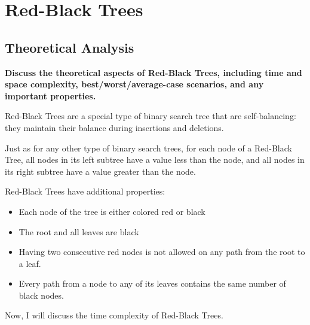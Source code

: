 \documentclass[12pt]{amsart}
\begin{document}
\section{Red-Black Trees}

\subsection{Theoretical Analysis}

    \textbf{Discuss the theoretical aspects of Red-Black Trees,
    including time and space complexity, best/worst/average-case
    scenarios, and any important properties.}
	
	Red-Black Trees are a special type of binary search tree
    that are self-balancing: they maintain their balance during
    insertions and deletions.
    
    Just as for any other type of binary search trees, for each
    node of a Red-Black Tree, all nodes in its left subtree have
    a value less than the node, and all nodes in its right
    subtree have a value greater than the node.
    
    Red-Black Trees have additional properties:
    
    \begin{itemize}
    	\item Each node of the tree is either colored red or
            black
    	\item The root and all leaves are black
    	\item Having two consecutive red nodes is not allowed on
            any path from the root to a leaf.
    	\item Every path from a node to any of its leaves
            contains the same number of black nodes.
    \end{itemize}
    
    Now, I will discuss the time complexity of Red-Black Trees.
    
\end{document}
